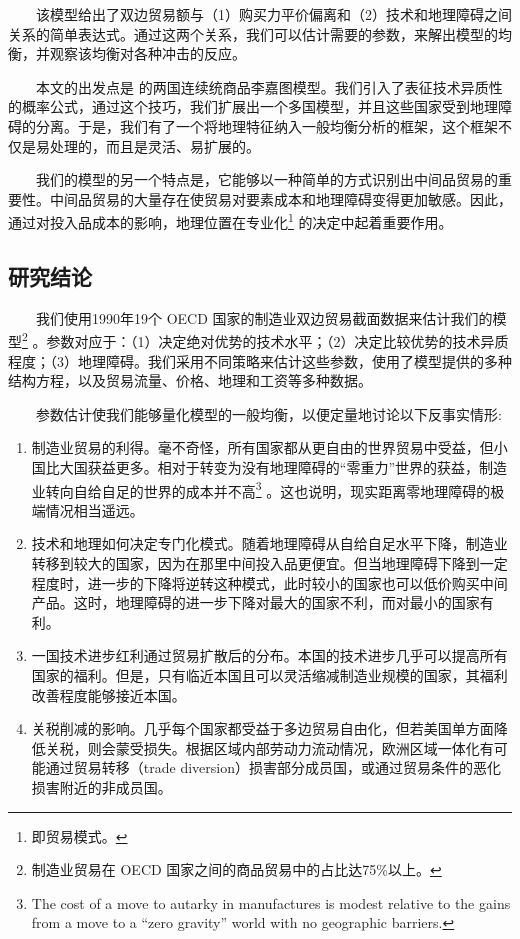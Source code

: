 \documentclass[]{article}
\let\rmarkdownfootnote\footnote%
\def\footnote{\protect\rmarkdownfootnote}
\begin{document}
　　该模型给出了双边贸易额与（1）购买力平价偏离和（2）技术和地理障碍之间关系的简单表达式。通过这两个关系，我们可以估计需要的参数，来解出模型的均衡，并观察该均衡对各种冲击的反应。

　　本文的出发点是 \citet{DFS1977} 的两国连续统商品李嘉图模型。我们引入了表征技术异质性的概率公式，通过这个技巧，我们扩展出一个多国模型，并且这些国家受到地理障碍的分离。于是，我们有了一个将地理特征纳入一般均衡分析的框架，这个框架不仅是易处理的，而且是灵活、易扩展的。

　　我们的模型的另一个特点是，它能够以一种简单的方式识别出中间品贸易的重要性。中间品贸易的大量存在使贸易对要素成本和地理障碍变得更加敏感。因此，通过对投入品成本的影响，地理位置在专业化\footnote{即贸易模式。} 的决定中起着重要作用。

\hypertarget{section-2}{%
\subsection{研究结论}\label{section-2}}

　　我们使用1990年19个 OECD 国家的制造业双边贸易截面数据来估计我们的模型\footnote{制造业贸易在 OECD 国家之间的商品贸易中的占比达75\%以上。} 。参数对应于：（1）决定绝对优势的技术水平；（2）决定比较优势的技术异质程度；（3）地理障碍。我们采用不同策略来估计这些参数，使用了模型提供的多种结构方程，以及贸易流量、价格、地理和工资等多种数据。

　　参数估计使我们能够量化模型的一般均衡，以便定量地讨论以下反事实情形:

\begin{enumerate}
\def\labelenumi{\arabic{enumi}.}
\item
  制造业贸易的利得。毫不奇怪，所有国家都从更自由的世界贸易中受益，但小国比大国获益更多。相对于转变为没有地理障碍的``零重力''世界的获益，制造业转向自给自足的世界的成本并不高\footnote{The cost of a move to autarky in manufactures is modest relative to the gains from a move to a ``zero gravity'' world with no geographic barriers.} 。这也说明，现实距离零地理障碍的极端情况相当遥远。
\item
  技术和地理如何决定专门化模式。随着地理障碍从自给自足水平下降，制造业转移到较大的国家，因为在那里中间投入品更便宜。但当地理障碍下降到一定程度时，进一步的下降将逆转这种模式，此时较小的国家也可以低价购买中间产品。这时，地理障碍的进一步下降对最大的国家不利，而对最小的国家有利。
\item
  一国技术进步红利通过贸易扩散后的分布。本国的技术进步几乎可以提高所有国家的福利。但是，只有临近本国且可以灵活缩减制造业规模的国家，其福利改善程度能够接近本国。
\item
  关税削减的影响。几乎每个国家都受益于多边贸易自由化，但若美国单方面降低关税，则会蒙受损失。根据区域内部劳动力流动情况，欧洲区域一体化有可能通过贸易转移（trade diversion）损害部分成员国，或通过贸易条件的恶化损害附近的非成员国。
\end{enumerate}
\end{document}

